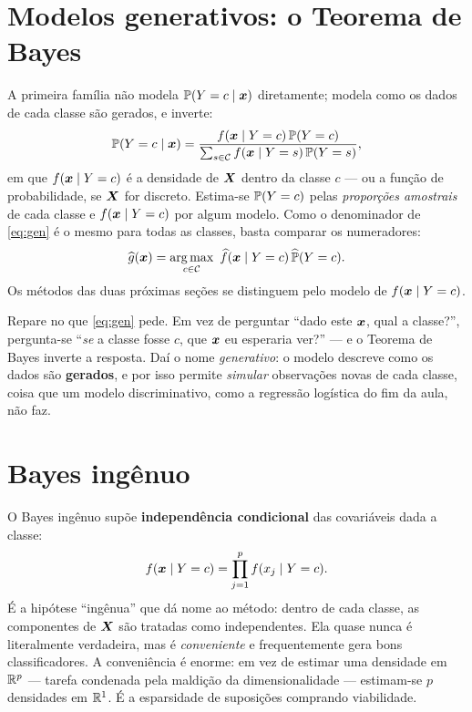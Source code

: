 \documentclass[11pt,a4paper]{article}
\begin{document}
\section{Modelos generativos: o Teorema de Bayes}
A primeira família não modela $\mathbb{P}(Y=c\mid\bm{x})$ diretamente; modela como os dados de
cada classe são gerados, e inverte:
\begin{equation}\label{eq:gen}
  \mathbb{P}(Y=c\mid\bm{x}) = \frac{f(\bm{x}\mid Y=c)\,\mathbb{P}(Y=c)}
                          {\sum_{s\in\mathcal{C}} f(\bm{x}\mid Y=s)\,\mathbb{P}(Y=s)},
\end{equation}
em que $f(\bm{x}\mid Y=c)$ é a densidade de $\bm{X}$ dentro da classe $c$ --- ou a função de
probabilidade, se $\bm{X}$ for discreto. Estima-se $\mathbb{P}(Y=c)$ pelas \emph{proporções
amostrais} de cada classe e $f(\bm{x}\mid Y=c)$ por algum modelo. Como o denominador de
\eqref{eq:gen} é o mesmo para todas as classes, basta comparar os numeradores:
\[
  \ghat(\x) = \argmax_{c\in\mathcal{C}}\ \widehat f(\x\mid Y=c)\,\widehat\Prob(Y=c).
\]
Os métodos das duas próximas seções se distinguem pelo modelo de $f(\bm{x}\mid Y=c)$.

\begin{ideia}
Repare no que \eqref{eq:gen} pede. Em vez de perguntar ``dado este $\bm{x}$, qual a
classe?'', pergunta-se ``\emph{se} a classe fosse $c$, que $\bm{x}$ eu esperaria ver?''
--- e o Teorema de Bayes inverte a resposta. Daí o nome \emph{generativo}: o modelo
descreve como os dados são \textbf{gerados}, e por isso permite \emph{simular}
observações novas de cada classe, coisa que um modelo discriminativo, como a
regressão logística do fim da aula, não faz.
\end{ideia}

\section{Bayes ingênuo}
O Bayes ingênuo supõe \textbf{independência condicional} das covariáveis dada a
classe:
\begin{equation}\label{eq:nb}
  f(\bm{x}\mid Y=c) = \prod_{j=1}^p f(x_j\mid Y=c).
\end{equation}
É a hipótese ``ingênua'' que dá nome ao método: dentro de cada classe, as
componentes de $\bm{X}$ são tratadas como independentes. Ela quase nunca é literalmente
verdadeira, mas é \emph{conveniente} e frequentemente gera bons classificadores. A
conveniência é enorme: em vez de estimar uma densidade em $\mathbb{R}^p$ --- tarefa
condenada pela maldição da dimensionalidade --- estimam-se $p$ densidades em $\mathbb{R}^1$.
É a esparsidade de suposições comprando viabilidade.
\end{document}
